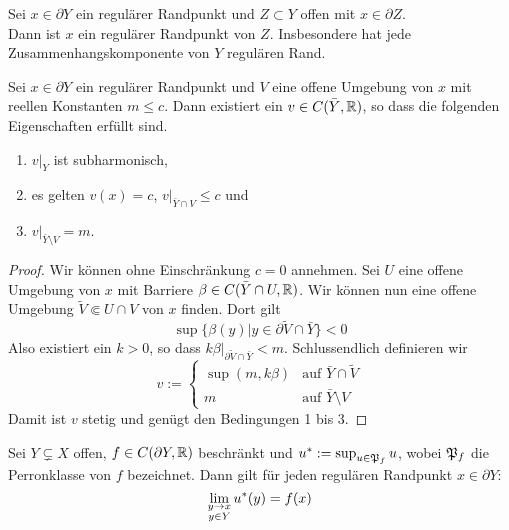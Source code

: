 \begin{cor}
  Sei $x \in \partial Y$ ein regulärer Randpunkt und $Z \subset Y$
  offen mit $x \in \partial Z$.\\
  Dann ist $x$ ein regulärer Randpunkt von $Z$. Insbesondere hat jede
  Zusammenhangskomponente von $Y$ regulären Rand.
\end{cor}

\begin{lemma}
  \label{lemma:regulär-trennen}
  Sei $x \in \partial Y$ ein regulärer Randpunkt und $V$ eine offene
  Umgebung von $x$ mit reellen Konstanten $m \leq c$. Dann existiert
  ein $v \in C( \bar Y, \mathbb{R})$, so dass die folgenden Eigenschaften
  erfüllt sind.
  \begin{enumerate}
  \item $v|_Y$ ist subharmonisch,
  \item es gelten $v(x) = c$, $v|_{\bar Y \cap V} \leq c$ und
  \item $v|_{\bar Y\setminus V} = m$.
  \end{enumerate}
\end{lemma}

\begin{proof}
  Wir können ohne Einschränkung $c = 0$ annehmen. Sei $U$ eine offene Umgebung von $x$ mit Barriere $\beta \in C(\bar
  Y \cap U, \mathbb{R})$. Wir können nun eine offene Umgebung $\tilde V \Subset U \cap V$
  von $x$ finden. Dort gilt
  \[
  \sup\{\beta(y)| y \in \partial \tilde V \cap \bar Y \} < 0
  \]
  Also existiert ein $k > 0$, so dass $k\beta|_{\partial \tilde V \cap
    \bar Y} < m$.
  Schlussendlich definieren wir
  \[
  v :=
  \begin{cases}
    \sup(m, k\beta) & \text{auf } \bar Y \cap \tilde V\\
    m & \text{auf } \bar Y \setminus V
  \end{cases}
  \]
  Damit ist $v$ stetig und genügt den Bedingungen 1 bis 3.
\end{proof}

\begin{lemma}
  Sei $Y \subsetneq X$ offen, $f \in C(\partial Y, \mathbb{R})$ beschränkt und
  $u^\ast := \sup_{u \in \mathfrak{P}_f}u$, wobei $\mathfrak{P}_f$ die Perronklasse von
  $f$ bezeichnet. Dann gilt für jeden regulären Randpunkt $x \in \partial Y$:
  \[
  \lim_{\substack{y \rightarrow x\\y \in Y}} u^\ast(y) = f(x)
  \]
\end{lemma}

